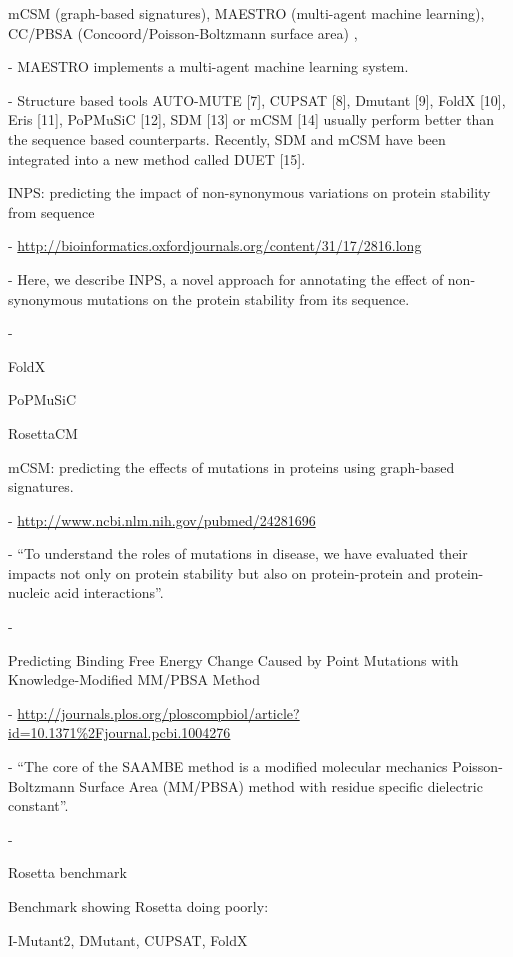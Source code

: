 mCSM  (graph-based signatures), MAESTRO  (multi-agent machine learning), CC/PBSA (Concoord/Poisson-Boltzmann surface area) ,

  - MAESTRO implements a multi-agent machine learning system.

  - Structure based tools AUTO-MUTE [7], CUPSAT [8], Dmutant [9], FoldX [10], Eris [11], PoPMuSiC [12], SDM [13] or mCSM [14] usually perform better than the sequence based counterparts. Recently, SDM and mCSM have been integrated into a new method called DUET [15].

INPS: predicting the impact of non-synonymous variations on protein stability from sequence

  - \url{http://bioinformatics.oxfordjournals.org/content/31/17/2816.long}

  - Here, we describe INPS, a novel approach for annotating the effect of non-synonymous mutations on the protein stability from its sequence.

  - \cite{fariselli_inps:_2015}

FoldX

PoPMuSiC

RosettaCM

mCSM: predicting the effects of mutations in proteins using graph-based signatures.

  - \url{http://www.ncbi.nlm.nih.gov/pubmed/24281696}

  - ``To understand the roles of mutations in disease, we have evaluated their impacts not only on protein stability but also on protein-protein and protein-nucleic acid interactions''.

  - \cite{pires_mcsm:_2014}


Predicting Binding Free Energy Change Caused by Point Mutations with Knowledge-Modified MM/PBSA Method

  - \url{http://journals.plos.org/ploscompbiol/article?id=10.1371%2Fjournal.pcbi.1004276}

  - ``The core of the SAAMBE method is a modified molecular mechanics Poisson-Boltzmann Surface Area (MM/PBSA) method with residue specific dielectric constant''.

  - \cite{petukh_predicting_2015}




Rosetta benchmark \cite{o_conchuir_web_2015}

Benchmark showing Rosetta doing poorly: \cite{potapov_assessing_2009}

I-Mutant2, DMutant, CUPSAT, FoldX \cite{khan_performance_2010}


